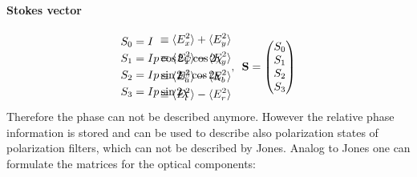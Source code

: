 \paragraph{Stokes vector}
\begin{align}
\begin{split}
S_0 &= I \\
S_1 &= I p \cos 2\psi \cos 2\chi \\
S_2 &= I p \sin 2\psi \cos 2\chi \\
S_3 &= I p \sin 2\chi
\end{split} \hspace{-6em}
\begin{split}
& \equiv \langle E_x^{2} \rangle + \langle E_y^{2} \rangle \\
& \equiv \langle E_x^{2} \rangle - \langle E_y^{2} \rangle \\
& \equiv \langle E_a^{2} \rangle - \langle E_b^{2} \rangle \\
& \equiv  \langle E_l^{2} \rangle - \langle E_r^{2} \rangle
\end{split}
, \enspace
\vec{S} =
\begin{pmatrix} S_0 \\ S_1 \\ S_2 \\ S_3\end{pmatrix}
\end{align}
% 
% 
Therefore the phase can not be described anymore. 
However the relative phase information is stored and can be used to describe also polarization states of polarization filters, which can not be described by Jones.
Analog to Jones one can formulate the matrices for the optical components:
% 
